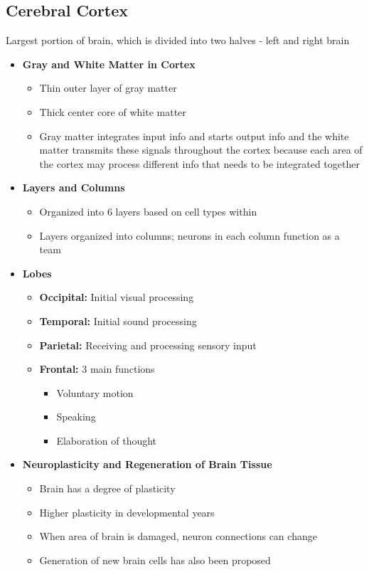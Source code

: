 \documentclass[11pt]{article}
\begin{document}
\subsection{Cerebral Cortex}
Largest portion of brain, which is divided into two halves - left and right brain
\begin{itemize}
\item \textbf{Gray and White Matter in Cortex}
\begin{itemize}
\item Thin outer layer of gray matter
\item Thick center core of white matter
\item Gray matter integrates input info and starts output info and the white matter transmits these signals throughout the cortex because each area of the cortex may process different info that needs to be integrated together
\end{itemize}
\item \textbf{Layers and Columns}
\begin{itemize}
\item Organized into 6 layers based on cell types within
\item Layers organized into columns; neurons in each column function as a team
\end{itemize}
\item \textbf{Lobes}
\begin{itemize}
\item \textbf{Occipital: }Initial visual processing
\item \textbf{Temporal:} Initial sound processing
\item \textbf{Parietal:} Receiving and processing sensory input
\item \textbf{Frontal:} 3 main functions
\begin{itemize}
\item Voluntary motion
\item Speaking
\item Elaboration of thought
\end{itemize}
\end{itemize}
\item \textbf{Neuroplasticity and Regeneration of Brain Tissue}
\begin{itemize}
\item Brain has a degree of plasticity 
\item Higher plasticity in developmental years
\item When area of brain is damaged, neuron connections can change
\item Generation of new brain cells has also been proposed
\end{itemize}
\end{itemize}
\pagebreak
\end{document}
